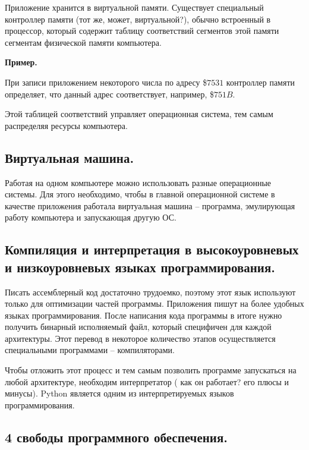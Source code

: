 \documentclass[a4paper, fleqn]{article}
\newenvironment{example}[1][]{\medskip \noindent \textbf{Пример. #1}\par \nopagebreak}{\medskip \par} %
\begin{document}
			Приложение хранится в виртуальной памяти. Существует специальный контроллер памяти (тот же, может, виртуальной?), обычно встроенный в процессор, который содержит таблицу соответствий сегментов этой памяти сегментам физической памяти компьютера.
			
			\begin{example}
				
				При записи приложением некоторого числа по адресу \$$7531$ контроллер памяти определяет, что данный адрес соответствует, например, \$$751B$. 
			\end{example}
			
			
			Этой таблицей соответствий управляет операционная система, тем самым распределяя ресурсы компьютера.
			
			\subsection*{Виртуальная машина.} 
		
			Работая на одном компьютере можно использовать разные операционные системы. Для этого необходимо, чтобы в главной операционной системе в качестве приложения работала виртуальная машина  – программа, эмулирующая работу компьютера и запускающая другую ОС. 
			
			\subsection*{Компиляция и интерпретация в высокоуровневых и низкоуровневых языках программирования.}
			
			Писать ассемблерный код достаточно трудоемко, поэтому этот язык используют только для оптимизации частей программы. Приложения пишут на более удобных языках программирования. После написания кода программы в итоге нужно получить бинарный исполняемый файл, который специфичен для каждой архитектуры. Этот перевод в некоторое количество этапов осуществляется специальными программами – компиляторами. 
			
			Чтобы отложить этот процесс и тем самым позволить программе запускаться на любой архитектуре, необходим интерпретатор ( как он работает? его плюсы и минусы). Python является одним из интерпретируемых языков программирования.
			
			\subsection*{4 свободы программного обеспечения.}
			
\end{document}
